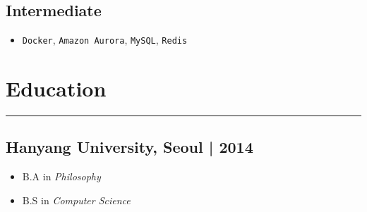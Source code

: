 \documentclass[11pt]{article}
\begin{document}
\subsection*{Intermediate}
\label{sec:org1099854}
\begin{itemize}[label=$\circ$,itemsep=-0.5ex]
\item \texttt{Docker}, \texttt{Amazon Aurora}, \texttt{MySQL}, \texttt{Redis}
\end{itemize}

\section*{Education}
\label{sec:org1a9c93e}
\vspace{-4ex}

\noindent\rule{\textwidth}{0.5pt}
\vspace{-4ex}

\subsection*{Hanyang University, Seoul | 2014}
\label{sec:org1686513}
\begin{itemize}[label=$\circ$,itemsep=-0.5ex]
\item B.A in \emph{Philosophy}
\item B.S in \emph{Computer Science}
\end{itemize}
\end{document}
